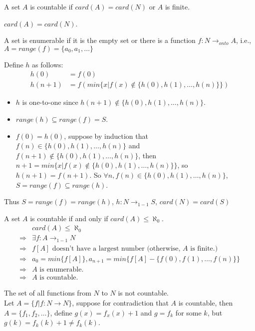  A set $A$ is countable if $card(A) = card(N)$
or $A$ is finite.

 $card(A) = card(N)$.

 A set is enumerable if it is the empty set or there is a
function $f : N \rightarrow_{onto} A$, i.e., $A = range(f) = \{a_0, a_1, \ldots\}$

 Define $h$ as follows:
\begin{align*}
  h(0) &= f(0) \\
  h(n+1) &= f(min\{x|f(x) \notin \{h(0), h(1),\ldots, h(n)\}\})
\end{align*}
\begin{itemize}
  \item $h$ is one-to-one since $h(n+1) \notin \{h(0), h(1),\ldots,h(n)\}$. \\
  \item $range(h) \subseteq range(f) = S$. \\
  \item $f(0)=h(0)$, suppose by induction that $f(n) \in \{h(0),h(1),\ldots,h(n)\}$ and $f(n+1) \notin
    \{h(0), h(1),\ldots,h(n)\}$, then $n+1 = min\{x|f(x) \notin
    \{h(0),h(1),\ldots,h(n)\}\}$, so $h(n+1)=f(n+1)$. So $\forall n, f(n) \in \{h(0),
    h(1),\ldots,h(n)\}$, $S=range(f) \subseteq range(h)$.\\
\end{itemize}
Thus $S=range(f) = range(h)$, $h:N\rightarrow_{1-1}S$, $card(N)=card(S)$

 A set $A$ is countable if and only if $card(A) \le
\mathbf{\aleph}_0$.
\begin{align*}
& card(A) \le \aleph_0 \\
\Rightarrow & \exists f:A \rightarrow_{1-1} N \\
\Rightarrow & f[A] \text{ doesn't have a largest number (otherwise, } A \text{ is
finite.)}\\
\Rightarrow & a_0 = min\{f[A]\}, a_{n+1}=min\{f[A]-\{f(0),f(1),\ldots,f(n)\}\}
\\
\Rightarrow & A \text{ is enumerable.} \\
\Rightarrow & A \text{ is countable.}
\end{align*}

 The set of all functions from $N$ to $N$ is not countable.\\
Let $A=\{f|f:N \rightarrow N\}$, suppose for contradiction that $A$ is countable,
then $A=\{f_1,f_2,\ldots\}$, define $g(x)=f_x(x)+1$ and $g = f_k$ for some $k$,
but $g(k)=f_k(k)+1 \neq f_k(k)$.

